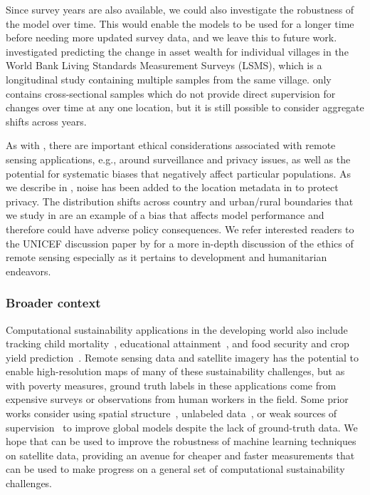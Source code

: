 Since survey years are also available, we could also investigate the robustness of the model over time. This would enable the models to be used for a longer time before needing more updated survey data, and we leave this to future work. \citet{yeh2020poverty} investigated predicting the change in asset wealth for individual villages in the World Bank Living Standards Measurement Surveys (LSMS), which is a longitudinal study containing multiple samples from the same village.
\PovertyMap only contains cross-sectional samples which do not provide direct supervision for changes over time at any one location, but it is still possible to consider aggregate shifts across years.

As with \FMoW, there are important ethical considerations associated with remote sensing applications,
e.g., around surveillance and privacy issues, as well as the potential for systematic biases that negatively affect particular populations.
As we describe in , noise has been added to the location metadata in \PovertyMap to protect privacy.
The distribution shifts across country and urban/rural boundaries that we study in \PovertyMap are an example of a bias that affects model performance and therefore could have adverse policy consequences.
We refer interested readers to the UNICEF discussion paper by \citet{berman2018ethical} for a more in-depth discussion of the ethics of remote sensing especially as it pertains to development and humanitarian endeavors.

\subsubsection{Broader context}
Computational sustainability applications in the developing world also include tracking child mortality~\citep{burke2016mortality,osgood2018mapping,reiner2018mortality}, educational attainment~\citep{graetz2018education}, and
food security and crop yield prediction~\citep{you2017crop,wang2020weakly,xie2020innout}.
Remote sensing data and satellite imagery has the potential to enable high-resolution maps of many of these sustainability challenges, but as with poverty measures, ground truth labels in these applications come from expensive surveys or observations from human workers in the field.
Some prior works consider using spatial structure~\citep{jean2018ssdkl,rolf2020post}, unlabeled data~\citep{xie2016transfer,jean2018ssdkl,xie2020innout}, or weak sources of supervision~\citep{wang2020weakly} to improve global models despite the lack of ground-truth data.
We hope that \PovertyMap can be used to improve the robustness of machine learning techniques on satellite data, providing an avenue for cheaper and faster measurements that can be used to make progress on a general set of computational sustainability challenges.

